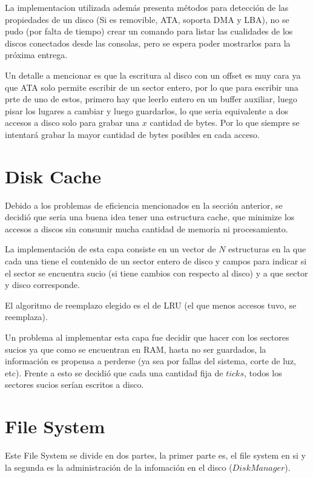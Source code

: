 \documentclass[english]{article}
\begin{document}
La implementacion utilizada además presenta métodos para detección
de las propiedades de un disco (Si es removible, ATA, soporta DMA
y LBA), no se pudo (por falta de tiempo) crear un comando para listar
las cualidades de los discos conectados desde las consolas, pero se
espera poder mostrarlos para la próxima entrega.

Un detalle a mencionar es que la escritura al disco con un offset
es muy cara ya que ATA solo permite escribir de un sector entero,
por lo que para escribir una prte de uno de estos, primero hay que
leerlo entero en un buffer auxiliar, luego pisar los lugares a cambiar
y luego guardarlos, lo que seria equivalente a dos accesos a disco
solo para grabar una $x$ cantidad de bytes. Por lo que siempre se
intentará grabar la mayor cantidad de bytes posibles en cada acceso.

\pagebreak{}


\section{Disk Cache}

Debido a los problemas de eficiencia mencionados en la sección anterior,
se decidió que seria una buena idea tener una estructura cache, que
minimize los accesos a discos sin consumir mucha cantidad de memoria
ni procesamiento. 

La implementación de esta capa consiste en un vector de $N$ estructuras 
en la que cada una tiene el contenido de un sector entero de disco y campos 
para indicar si el sector se encuentra sucio (si tiene cambios con respecto 
al disco) y a que sector y disco corresponde.

El algoritmo de reemplazo elegido es el de LRU (el que menos accesos
tuvo, se reemplaza). 

Un problema al implementar esta capa fue decidir que hacer con los sectores
sucios ya que como se encuentran en RAM, hasta no ser guardados, la
información es propensa a perderse (ya sea por fallas del sistema,
corte de luz, etc). Frente a esto se decidió que cada una cantidad
fija de $ticks$, todos los sectores sucios serían escritos a disco. 

\pagebreak{}


\section{File System}

Este File System se divide en dos partes, la primer parte es, el
file system en si y la segunda es la administración de la infomación
en el disco ($DiskManager$).
\end{document}
